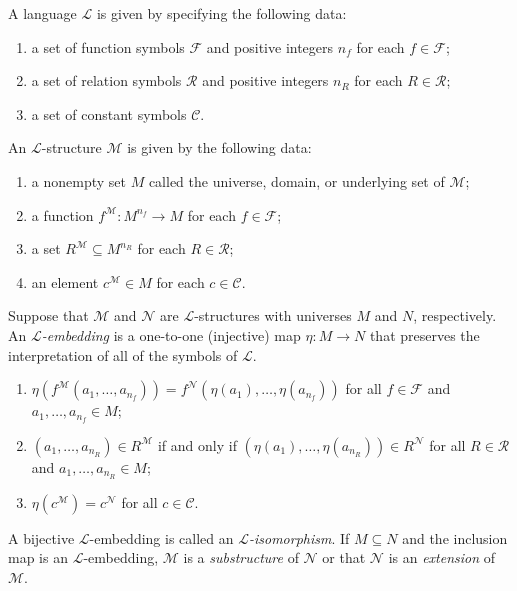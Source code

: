 \documentclass[
	fontsize=10pt, %
]{kaohandt}
\begin{document}
\begin{definition}
A language $\mathcal{L}$ is given by specifying the following data:
\begin{enumerate}[label = {(\roman*)}]
    \item a set of function symbols $\mathcal{F}$ and positive integers $n_f$ for each $f \in \mathcal{F}$;
    \item a set of relation symbols $\mathcal{R}$ and positive integers $n_R$ for each $R \in \mathcal{R}$;
    \item a set of constant symbols $\mathcal{C}$.
\end{enumerate}
\end{definition}

\begin{definition}
An $\mathcal{L}$-structure $\mathcal{M}$ is given by the following data:
    \begin{enumerate}[label = {(\roman*)}]
    \item a nonempty set $M$ called the universe, domain, or underlying set of $\mathcal{M}$;
    \item a function $f^{\mathcal{M}} : M^{n_f} \to M$ for each $f \in \mathcal{F}$;
    \item a set $R^{\mathcal{M}} \subseteq M^{n_R}$ for each $R \in \mathcal{R}$;
    \item an element $c^{\mathcal{M}} \in M$ for each $c \in \mathcal{C}$.
    \end{enumerate}
\end{definition}

\begin{definition}
    Suppose that $\mathcal{M}$ and $\mathcal{N}$ are $\mathcal{L}$-structures with universes $M$ and $N$, respectively.
    An \emph{$\mathcal{L}$-embedding} is a one-to-one (injective) map $\eta: M \to N$ that preserves the interpretation of all of the symbols of $\mathcal{L}$.
    \begin{enumerate}[label = {(\roman*)}]
        \item $\eta(f^{\mathcal{M}}(a_1,\dots,a_{n_f})) = f^{\mathcal{N}}(\eta(a_1),\dots,\eta(a_{n_f}))$ for all $f\in \mathcal{F}$ and $a_1,\dots,a_{n_f} \in M$;
        \item $(a_1,\dots,a_{n_R}) \in R^{\mathcal{M}}$ if and only if $(\eta(a_1),\dots,\eta(a_{n_R})) \in R^{\mathcal{N}}$ for all $R \in \mathcal{R}$ and $a_1,\dots,a_{n_R} \in M$;
        \item $\eta(c^{\mathcal{M}}) = c^{\mathcal{N}}$ for all $c \in \mathcal{C}$.
    \end{enumerate}
    A bijective $\mathcal{L}$-embedding is called an \emph{$\mathcal{L}$-isomorphism}.
    If $M \subseteq N$ and the inclusion map is an $\mathcal{L}$-embedding,
    $\mathcal{M}$ is a \emph{substructure} of $\mathcal{N}$ or that
    $\mathcal{N}$ is an \emph{extension} of $\mathcal{M}$.
\end{definition}
\end{document}
